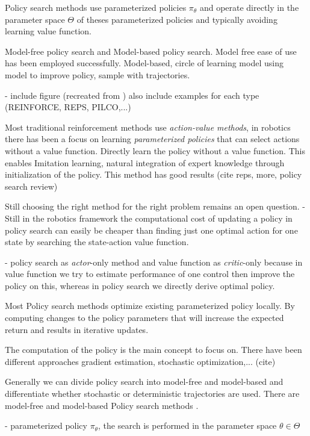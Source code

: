 Policy search methods use parameterized policies $\pi_{\theta}$ and operate
directly in the parameter space $\Theta$ of theses parameterized policies and
typically avoiding learning value function.

Model-free policy search and Model-based policy search.
Model free ease of use has been employed successfully.
Model-based, circle of learning model using model to improve policy,
sample with trajectories.

- include figure (recreated from \citet{deisenroth2013survey})
  also include examples for each type (REINFORCE, REPS, PILCO,...)

Most traditional reinforcement methods use \textit{action-value methods}, in robotics
there has been a focus on learning \textit{parameterized policies} that can select
actions without a value function.
Directly learn the policy without a value function.
This enables Imitation learning, natural integration of expert knowledge through
initialization of the policy.
This method has good results (cite reps, more, policy search review)

Still choosing the right method for the right problem remains an open question.
- Still in the robotics framework the computational cost of updating
a policy in policy search can easily be cheaper than finding just one
optimal action for one state by searching the state-action value function.

- policy search as \textit{actor}-only method and value function as \textit{critic}-only
because in value function we try to estimate performance of one control then improve
the policy on this, whereas in policy search we directly derive optimal policy.

Most Policy search methods optimize existing parameterized policy locally. By computing
changes to the policy parameters that will increase the expected return and results
in iterative updates.

The computation of the policy is the main concept to focus on. There have
been different approaches gradient estimation, stochastic optimization,... (cite)

Generally we can divide policy search into model-free and model-based and
differentiate whether stochastic or deterministic trajectories are used.
There are model-free and model-based Policy search methods \citet{deisenroth2013survey}.

- parameterized policy $\pi_{\theta}$, the search is performed in the parameter space
$\theta \in \Theta$

